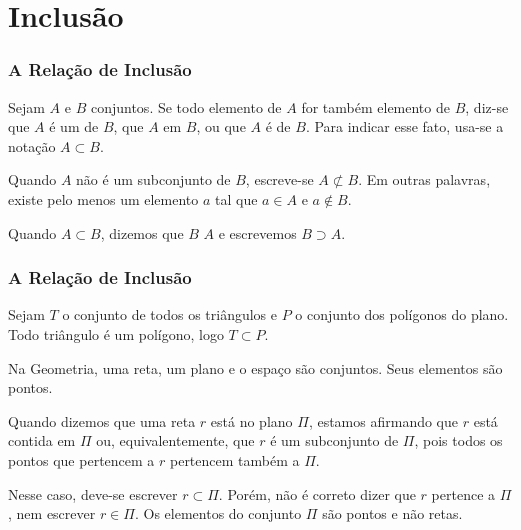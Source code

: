 \section{Inclusão}


\begin{frame}
\frametitle{A Relação de Inclusão} %

\begin{Def}
Sejam $A$ e $B$ conjuntos. Se todo elemento de $A$ for também
elemento de $B$, diz-se que $A$ é um  de $B$, que
$A$  em $B$, ou que $A$ é  de $B$. Para
indicar esse fato, usa-se a notação $A \subset B$.

\end{Def}

Quando $A$ não é um subconjunto de $B$, escreve-se $A \not\subset
B$. Em outras palavras, existe pelo menos um elemento $a$ tal que $a
\in A$ e $a \notin B$.
\bigskip

Quando $A \subset B$, dizemos que $B$  $A$ e escrevemos
$B \supset A$.


\end{frame}



\begin{frame}
\frametitle{A Relação de Inclusão} %

\begin{Exem}
Sejam $T$ o conjunto de todos os triângulos e $P$ o conjunto dos
polígonos do plano. Todo triângulo é um polígono, logo $ T \subset
P$.
\end{Exem}

\begin{Exem}
Na Geometria, uma reta, um plano e o espaço são conjuntos. Seus
elementos são pontos.

Quando dizemos que uma reta $r$ está no plano $\Pi$, estamos
afirmando que $r$ está contida em $\Pi$ ou, equivalentemente, que
$r$ é um subconjunto de $\Pi$, pois todos os pontos que pertencem a
$r$ pertencem também a $\Pi$.

Nesse caso, deve-se escrever $ r \subset \Pi$. Porém, não é correto
dizer que $r$ pertence a $\Pi$, nem escrever $r \in \Pi$. Os
elementos do conjunto $\Pi$ são pontos e não retas.
\end{Exem}

\end{frame}


